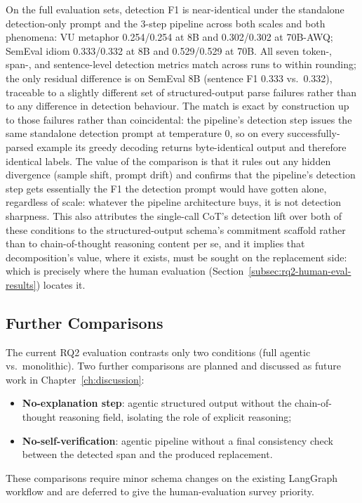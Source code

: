 
On the full evaluation sets, detection F1 is near-identical under the standalone detection-only prompt and the 3-step pipeline across both scales and both phenomena: VU metaphor 0.254/0.254 at 8B and 0.302/0.302 at 70B-AWQ; SemEval idiom 0.333/0.332 at 8B and 0.529/0.529 at 70B. All seven token-, span-, and sentence-level detection metrics match across runs to within rounding; the only residual difference is on SemEval 8B (sentence F1 0.333 vs.\ 0.332), traceable to a slightly different set of structured-output parse failures rather than to any difference in detection behaviour. The match is exact by construction up to those failures rather than coincidental: the pipeline's detection step issues the same standalone detection prompt at temperature $0$, so on every successfully-parsed example its greedy decoding returns byte-identical output and therefore identical labels. The value of the comparison is that it rules out any hidden divergence (sample shift, prompt drift) and confirms that the pipeline's detection step gets essentially the F1 the detection prompt would have gotten alone, regardless of scale: whatever the pipeline architecture buys, it is not detection sharpness. This also attributes the single-call CoT's detection lift over both of these conditions to the structured-output schema's commitment scaffold rather than to chain-of-thought reasoning content per se, and it implies that decomposition's value, where it exists, must be sought on the replacement side: which is precisely where the human evaluation (Section~\ref{subsec:rq2-human-eval-results}) locates it.

\subsection{Further Comparisons}

The current RQ2 evaluation contrasts only two conditions (full agentic vs.\ monolithic). Two further comparisons are planned and discussed as future work in Chapter~\ref{ch:discussion}:
\begin{itemize}
    \item \textbf{No-explanation step}: agentic structured output without the chain-of-thought reasoning field, isolating the role of explicit reasoning;
    \item \textbf{No-self-verification}: agentic pipeline without a final consistency check between the detected span and the produced replacement.
\end{itemize}
These comparisons require minor schema changes on the existing LangGraph workflow and are deferred to give the human-evaluation survey priority.

